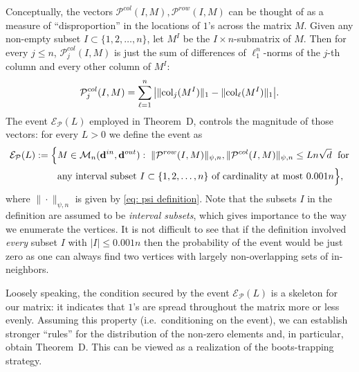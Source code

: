 \documentclass[12pt]{article}
\theoremstyle{definition}
\theoremstyle{plain}
\newcommand{\Event}{\mathcal{E}}
\def\InDeg{{\bf d}^{in}}
\def\OutDeg{{\bf d}^{out}}
\def\MatrixSet{{\mathcal M}_n}
\def\Col{{\rm col}}
\def\pvector{{\mathcal P}}
\begin{document}
Conceptually, the vectors $\pvector^{col}(I,M),\pvector^{row}(I,M)$ can be thought of as
a measure of ``disproportion'' in the locations of $1$'s across the matrix $M$.
Given any non-empty subset $I\subset\{1,2,\dots,n\}$, let $M^I$ be the $I\times n$-submatrix of $M$.
Then for every $j\leq n$, $\pvector_j^{col}(I,M)$ is just the sum of differences of $\ell_1^n$-norms
of the $j$-th column and every other column of $M^I$:
$$\pvector_j^{col}(I,M)=\sum_{\ell=1}^n \big|\|\Col_j(M^I)\|_1-\|\Col_\ell(M^I)\|_{1}\big|.$$
The event $\Event_\pvector(L)$ employed in Theorem~D, controls the magnitude of those vectors:
for every $L>0$ we define the event as
\begin{equation}\label{eq: event pvector definition}
\begin{split}
\Event_\pvector(L):=\Big\{&M\in\MatrixSet(\InDeg,\OutDeg):\;
\|\pvector^{row}(I,M)\|_{\psi,n},\|\pvector^{col}(I,M)\|_{\psi,n}\leq  L  n\sqrt{d}\;\mbox{ for}\\
&\mbox{any interval subset $I\subset\{1,2,\dots,n\}$ of cardinality at most $0.001 n$}\Big\},\end{split}
\end{equation}
where $\|\cdot\|_{\psi,n}$ is given by \eqref{eq: psi definition}.
Note that the subsets $I$ in the definition are assumed to be {\it interval subsets},
which gives importance to the way we enumerate the vertices.
It is not difficult to see that if the definition involved {\it every} subset $I$ with $|I|\leq 0.001 n$ then the probability
of the event would be just zero as one can always find two vertices with largely non-overlapping
sets of in-neighbors. 

Loosely speaking, the condition secured by the event $\Event_\pvector(L)$ is a skeleton for our matrix:
it indicates that $1$'s are spread throughout the matrix more or less evenly.
Assuming this property (i.e.\ conditioning on the event), we can establish stronger ``rules'' for the distribution
of the non-zero elements and, in particular, obtain Theorem~D.
This can be viewed as a realization of the boots-trapping strategy.
\end{document}
